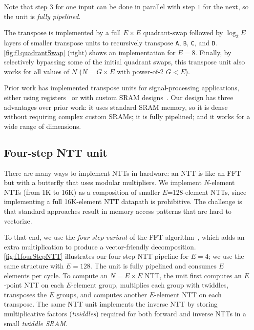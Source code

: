 Note that step $3$ for one input can be done in parallel with step $1$ for the next, so the unit is \emph{fully pipelined}.

The transpose is implemented by a full $E \times E$ quadrant-swap followed by $\log_2E$ layers of smaller transpose units
to recursively transpose \texttt{A}, \texttt{B}, \texttt{C}, and \texttt{D}. \autoref{fig:f1quadrantSwap} (right) shows an implementation for $E=8$. Finally, by selectively bypassing some of the initial quadrant swaps,
this transpose unit also works for all values of $N$ ($N=G\times E$ with power-of-2 $G < E$).

Prior work has implemented transpose units for signal-processing applications,
either using registers~\cite{wang2018pipelined,zhang2020novel} or with custom SRAM designs~\cite{shang2014single}.
Our design has three advantages over prior work: it uses standard SRAM memory,
so it is dense without requiring complex custom SRAMs;
it is fully pipelined; and it works for a wide range of dimensions.

\subsection{Four-step NTT unit}\label{sec:fourStepNTT}




There are many ways to implement NTTs in hardware:
an NTT is like an FFT~\cite{cooley:moc65:algorithm}
but with a butterfly that uses modular multipliers.
We implement $N$-element NTTs (from 1K to 16K) as a composition
of smaller $E$=128-element NTTs,
since implementing a full 16K-element NTT datapath is prohibitive.
The challenge is that standard approaches result in memory access patterns
that are hard to vectorize.

\figFOneFourStepNTT

To that end, we use the \textit{four-step variant} of the FFT algorithm~\cite{bailey:supercomputing89:FFTs},
which adds an extra multiplication to produce a vector-friendly decomposition.
\autoref{fig:f1fourStepNTT} illustrates 
our
four-step NTT pipeline for $E=4$;
we use the same structure with $E=128$.
The unit is fully pipelined and consumes $E$ elements per cycle.
To compute an $N=E\times E$ NTT, the unit first computes an $E$-point NTT on each $E$-element group,
multiplies each group with twiddles,
transposes the $E$ groups, and computes another $E$-element NTT on each transpose.
The same NTT unit implements the inverse NTT
by storing multiplicative factors (\textit{twiddles}) required for both forward and inverse NTTs in a small \textit{twiddle SRAM}.


